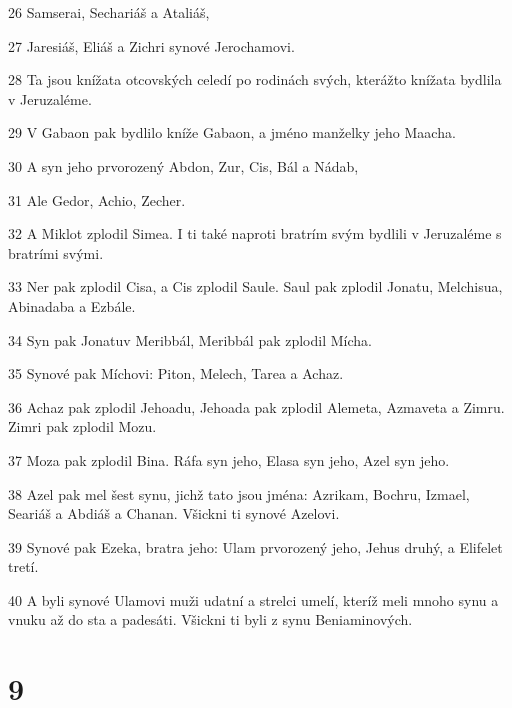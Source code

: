\par 26 Samserai, Sechariáš a Ataliáš,
\par 27 Jaresiáš, Eliáš a Zichri synové Jerochamovi.
\par 28 Ta jsou knížata otcovských celedí po rodinách svých, kterážto knížata bydlila v Jeruzaléme.
\par 29 V Gabaon pak bydlilo kníže Gabaon, a jméno manželky jeho Maacha.
\par 30 A syn jeho prvorozený Abdon, Zur, Cis, Bál a Nádab,
\par 31 Ale Gedor, Achio, Zecher.
\par 32 A Miklot zplodil Simea. I ti také naproti bratrím svým bydlili v Jeruzaléme s bratrími svými.
\par 33 Ner pak zplodil Cisa, a Cis zplodil Saule. Saul pak zplodil Jonatu, Melchisua, Abinadaba a Ezbále.
\par 34 Syn pak Jonatuv Meribbál, Meribbál pak zplodil Mícha.
\par 35 Synové pak Míchovi: Piton, Melech, Tarea a Achaz.
\par 36 Achaz pak zplodil Jehoadu, Jehoada pak zplodil Alemeta, Azmaveta a Zimru. Zimri pak zplodil Mozu.
\par 37 Moza pak zplodil Bina. Ráfa syn jeho, Elasa syn jeho, Azel syn jeho.
\par 38 Azel pak mel šest synu, jichž tato jsou jména: Azrikam, Bochru, Izmael, Seariáš a Abdiáš a Chanan. Všickni ti synové Azelovi.
\par 39 Synové pak Ezeka, bratra jeho: Ulam prvorozený jeho, Jehus druhý, a Elifelet tretí.
\par 40 A byli synové Ulamovi muži udatní a strelci umelí, kteríž meli mnoho synu a vnuku až do sta a padesáti. Všickni ti byli z synu Beniaminových.

\chapter{9}

